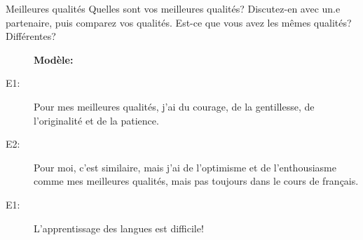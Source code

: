 \begin{frame}{Meilleures qualités}
  Quelles sont vos meilleures qualités?
  Discutez-en avec un.e partenaire, puis comparez vos qualités.
  Est-ce que vous avez les mêmes qualités? Différentes?
  \begin{description}
    \item[] \textbf{Modèle:}
    \item[E1:] Pour mes meilleures qualités, j'ai du courage, de la gentillesse, de l'originalité et de la patience.
    \item[E2:] Pour moi, c'est similaire, mais j'ai de l'optimisme et de l'enthousiasme comme mes meilleures qualités, mais pas toujours dans le cours de français.
    \item[E1:] L'apprentissage des langues est difficile!
  \end{description}
\end{frame}